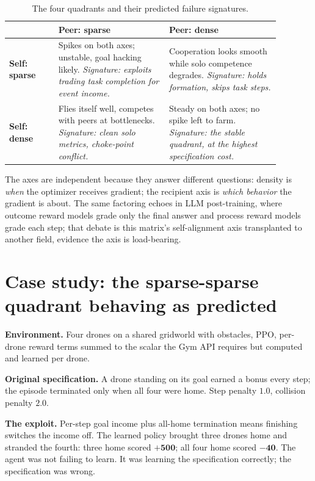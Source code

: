 \documentclass[11pt]{article}
\begin{document}
\begin{table}[h]
\centering
\small
\begin{tabular}{p{0.16\linewidth}p{0.36\linewidth}p{0.36\linewidth}}
\toprule
 & \textbf{Peer: sparse} & \textbf{Peer: dense} \\
\midrule
\textbf{Self: sparse} & Spikes on both axes; unstable, goal hacking likely. \emph{Signature: exploits trading task completion for event income.} & Cooperation looks smooth while solo competence degrades. \emph{Signature: holds formation, skips task steps.} \\
\addlinespace
\textbf{Self: dense} & Flies itself well, competes with peers at bottlenecks. \emph{Signature: clean solo metrics, choke-point conflict.} & Steady on both axes; no spike left to farm. \emph{Signature: the stable quadrant, at the highest specification cost.} \\
\bottomrule
\end{tabular}
\caption{The four quadrants and their predicted failure signatures.}
\end{table}

The axes are independent because they answer different questions: density is \emph{when} the optimizer receives gradient; the recipient axis is \emph{which behavior} the gradient is about. The same factoring echoes in LLM post-training, where outcome reward models grade only the final answer and process reward models grade each step; that debate is this matrix's self-alignment axis transplanted to another field, evidence the axis is load-bearing.

\section{Case study: the sparse-sparse quadrant behaving as predicted}
\textbf{Environment.} Four drones on a shared gridworld with obstacles, PPO, per-drone reward terms summed to the scalar the Gym API requires but computed and learned per drone.

\textbf{Original specification.} A drone standing on its goal earned a bonus every step; the episode terminated only when all four were home. Step penalty $1.0$, collision penalty $2.0$.

\textbf{The exploit.} Per-step goal income plus all-home termination means finishing switches the income off. The learned policy brought three drones home and stranded the fourth: three home scored $\mathbf{+500}$; all four home scored $\mathbf{-40}$. The agent was not failing to learn. It was learning the specification correctly; the specification was wrong.
\end{document}
